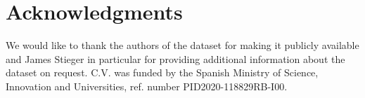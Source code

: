 \documentclass[preprint,authoryear,semicolon,12pt]{elsarticle}
\begin{document}
\section*{Acknowledgments}

We would like to thank the authors of the dataset for making it publicly available and James Stieger in particular for providing additional information about the dataset on request. C.V. was funded by the Spanish Ministry of Science, Innovation and Universities, ref. number PID2020-118829RB-I00.

 

\end{document}
